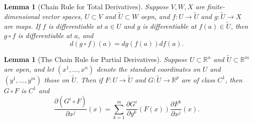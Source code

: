 \documentclass[reqno]{amsart}
\newtheorem{lemma}[theorem]{Lemma}
\theoremstyle{definition}
\theoremstyle{remark}
\begin{document}
   \begin{lemma}[Chain Rule for Total Derivatives]\label{Chain-Rule}
       Suppose $V,W,X$ are finite-dimensional vector spaces,
       $U \subset V$ and $\tilde{U}\subset W$ oepn,
       and $f \colon U \to \tilde{U}$ and
       $g \colon \tilde{U} \to X$ are maps.
       If $f$ is differentiable at $a \in U$ and
       $g$ is differentiable at $f(a) \in 
       \tilde{U}$, then
       $g \circ f$ is differentiable at $a$, and
       \[
       d \left( g \circ f \right) (a)
    = dg\left( f(a) \right) df(a).
       \] 
   \end{lemma}

   \begin{lemma}[The Chain Rule for Partial
       Derivatives]\label{chain-rule-partial-derivatives}
       Suppose $U \subset \mathbb{R}^{n}$ and
       $\tilde{U}\subset \mathbb{R}^{m}$ are open, and
       let $\left( x^{1},\ldots,x^{n} \right) $ denote the
       standard coordinates on $U$ and
       $\left( y^{1},\ldots, y^{m} \right) $ those
       on $\tilde{U}$.
       Then if $F \colon U \to \tilde{U}$ and
       $G \colon \tilde{U} \to \mathbb{R}^{p}$ are
       of class $C^{1}$, then
       $G \circ F$ is $C^{1}$ and
       \[
       \frac{\partial \left( G^{i} \circ F \right) }{\partial
       x^{j}} (x)
       = \sum_{k=1}^{m}
       \frac{\partial G^{i}}{\partial y^{k}}(F(x))
       \frac{\partial F^{k}}{\partial x^{j}}(x).
       \] 
   \end{lemma}

\printbibliography
\end{document}
